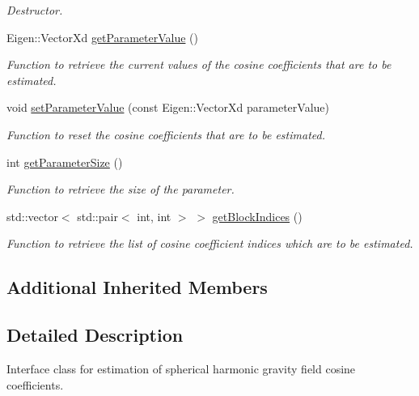 \begin{DoxyCompactItemize}
\begin{DoxyCompactList}\small\item\em Destructor. \end{DoxyCompactList}\item 
Eigen\+::\+Vector\+Xd \hyperlink{classtudat_1_1estimatable__parameters_1_1SphericalHarmonicsCosineCoefficients_af6d41ec450351355acfc0926a1f48c45}{get\+Parameter\+Value} ()
\begin{DoxyCompactList}\small\item\em Function to retrieve the current values of the cosine coefficients that are to be estimated. \end{DoxyCompactList}\item 
void \hyperlink{classtudat_1_1estimatable__parameters_1_1SphericalHarmonicsCosineCoefficients_a83b148618a4198a251bf8c651c19427b}{set\+Parameter\+Value} (const Eigen\+::\+Vector\+Xd parameter\+Value)
\begin{DoxyCompactList}\small\item\em Function to reset the cosine coefficients that are to be estimated. \end{DoxyCompactList}\item 
int \hyperlink{classtudat_1_1estimatable__parameters_1_1SphericalHarmonicsCosineCoefficients_a321eb698efe3468fd266620fa426b042}{get\+Parameter\+Size} ()
\begin{DoxyCompactList}\small\item\em Function to retrieve the size of the parameter. \end{DoxyCompactList}\item 
std\+::vector$<$ std\+::pair$<$ int, int $>$ $>$ \hyperlink{classtudat_1_1estimatable__parameters_1_1SphericalHarmonicsCosineCoefficients_a74a5de58521fef27b93a4e865c5b260c}{get\+Block\+Indices} ()
\begin{DoxyCompactList}\small\item\em Function to retrieve the list of cosine coefficient indices which are to be estimated. \end{DoxyCompactList}\end{DoxyCompactItemize}
\subsection*{Additional Inherited Members}


\subsection{Detailed Description}
Interface class for estimation of spherical harmonic gravity field cosine coefficients. 

